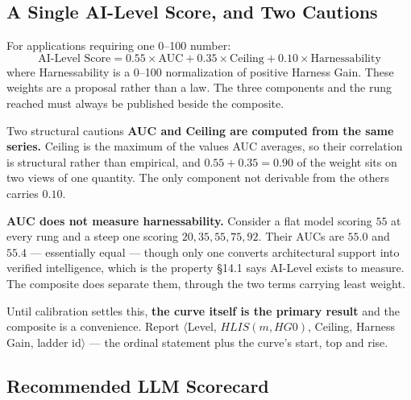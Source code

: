 \documentclass[11pt]{article}
\theoremstyle{definition}
\begin{document}
\subsection{A Single AI-Level Score, and Two Cautions}\label{sec:composite}

For applications requiring one 0--100 number:
\begin{equation}
\text{AI-Level Score} = 0.55 \times \text{AUC} + 0.35 \times \text{Ceiling} + 0.10 \times \text{Harnessability}
\end{equation}
where Harnessability is a 0--100 normalization of positive Harness Gain. These weights are a proposal rather than a law. The three components and the rung reached must always be published beside the composite.

\begin{cautionbox}{Two structural cautions}
\textbf{AUC and Ceiling are computed from the same series.} Ceiling is the maximum of the values AUC averages, so their correlation is structural rather than empirical, and $0.55 + 0.35 = 0.90$ of the weight sits on two views of one quantity. The only component not derivable from the others carries $0.10$.

\textbf{AUC does not measure harnessability.} Consider a flat model scoring $55$ at every rung and a steep one scoring $20, 35, 55, 75, 92$. Their AUCs are $55.0$ and $55.4$ --- essentially equal --- though only one converts architectural support into verified intelligence, which is the property \S14.1 says AI-Level exists to measure. The composite does separate them, through the two terms carrying least weight.

Until calibration settles this, \textbf{the curve itself is the primary result} and the composite is a convenience. Report $\langle$Level, $HLIS(m,HG0)$, Ceiling, Harness Gain, ladder id$\rangle$ --- the ordinal statement plus the curve's start, top and rise.
\end{cautionbox}

\subsection{Recommended LLM Scorecard}
\end{document}
